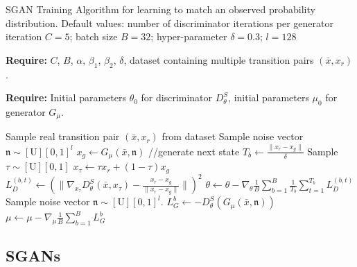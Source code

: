 \documentclass[letterpaper]{article} %
\begin{document}
\begin{algorithm}
    \caption{SGAN Training Algorithm for learning to match an observed probability distribution. Default values: number of discriminator iterations per generator iteration $C=5$; batch size $B=32$; hyper-parameter $\delta=0.3$; $l=128$}
    \label{algorithm-table-sgan}

    \textbf{Require:} $C$, $B$, $\alpha$, $\beta_1$, $\beta_2$, $\delta$, dataset containing multiple transition pairs $(\bar{x},x_r)$.

    \textbf{Require:} Initial parameters $\theta_0$ for discriminator $D_{\theta}^S$, initial parameters $\mu_0$ for generator $G_\mu$.
\begin{algorithmic}[1]
                \STATE Sample real transition pair $(\bar{x},x_r)$ from dataset
                \STATE Sample noise vector $\mathfrak{n} \sim [\text{U}][0,1]^l$
                \STATE $x_g\leftarrow G_{\mu}(\bar{x},\mathfrak{n})$ //generate next state
                \STATE $T_b \leftarrow \frac{\|x_r-x_g\|}{\delta}$
                    \STATE Sample $\tau \sim [\text{U}][0,1]$
                    \STATE $x_\tau \leftarrow \tau x_{r} + (1-\tau) x_g$
                    \STATE $L_D^{(b,t)} \leftarrow (\|\nabla_{x_{\tau}}D_{\theta}^S(\bar{x},x_{\tau})-\frac{x_{r}-x_{g}}{\|x_{r}-x_{g}\|}\|)^2$
                \ENDFOR
            \ENDFOR
            \STATE $\theta \leftarrow \theta -  \nabla_{\theta}\frac{1}{B}\sum_{b=1}^{B}\frac{1}{T_b}\sum_{t=1}^{T_b}L_D^{(b,t)}$
        \ENDFOR
            \STATE Sample noise vector $\mathfrak{n} \sim [\text{U}][0,1]^l$.
            \STATE $L_G^{b} \leftarrow -D_{\theta}^S(G_{\mu}(\bar{x},\mathfrak{n}))$
        \ENDFOR
        \STATE $\mu \leftarrow \mu- \nabla_{\mu}\frac{1}{B}\sum_{b=1}^{B}L_G^{b}$
    \ENDWHILE
\end{algorithmic}
\end{algorithm}

\subsection{SGANs}
\end{document}

